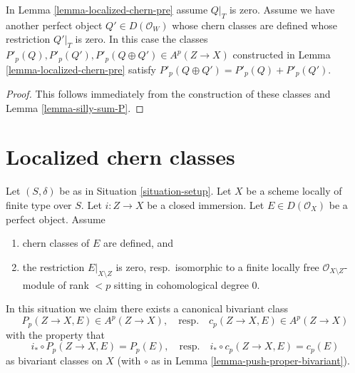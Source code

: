 \begin{lemma}
\label{lemma-localized-chern-pre-sum-P}
In Lemma \ref{lemma-localized-chern-pre} assume $Q|_T$ is zero.
Assume we have another perfect object $Q' \in D(\mathcal{O}_W)$
whose chern classes are defined whose restriction $Q'|_T$ is zero.
In this case the classes
$P'_p(Q), P'_p(Q'), P'_p(Q \oplus Q') \in A^p(Z \to X)$
constructed in Lemma \ref{lemma-localized-chern-pre}
satisfy $P'_p(Q \oplus Q') = P'_p(Q) + P'_p(Q')$.
\end{lemma}

\begin{proof}
This follows immediately from the construction of these
classes and Lemma \ref{lemma-silly-sum-P}.
\end{proof}









 
\section{Localized chern classes}
\label{section-localized-chern}

\noindent
Let $(S, \delta)$ be as in Situation \ref{situation-setup}. Let $X$ be a scheme
locally of finite type over $S$. Let $i : Z \to X$ be a closed immersion.
Let $E \in D(\mathcal{O}_X)$ be a perfect object. Assume
\begin{enumerate}
\item chern classes of $E$ are defined, and
\item the restriction $E|_{X \setminus Z}$ is zero, resp.\ isomorphic to a
finite locally free $\mathcal{O}_{X \setminus Z}$-module of rank $< p$
sitting in cohomological degree $0$.
\end{enumerate}
In this situation we claim there exists a canonical bivariant class
$$
P_p(Z \to X, E) \in A^p(Z \to X),
\quad\text{resp.}\quad
c_p(Z \to X, E) \in A^p(Z \to X)
$$
with the property that
\begin{equation}
\label{equation-defining-property-localized-classes}
i_* \circ P_p(Z \to X, E) = P_p(E),
\quad\text{resp.}\quad
i_* \circ c_p(Z \to X, E) = c_p(E)
\end{equation}
as bivariant classes on $X$ (with $\circ$ as in
Lemma \ref{lemma-push-proper-bivariant}).

